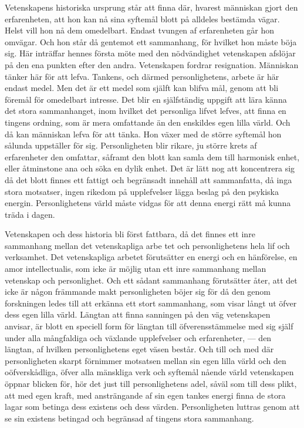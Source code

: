 \documentclass[12pt]{article}
\newcommand{\opage}[1]{\marginnote{\footnotesize\textit{[#1]}}}
\begin{document}
Vetenskapens historiska ursprung står att finna där, hvarest människan gjort den erfarenheten, att hon kan nå sina syftemål blott på alldeles bestämda vägar. Helst vill hon nå dem omedelbart. Endast tvungen af erfarenheten går hon omvägar. Och hon står då gentemot ett sammanhang, för hvilket hon måste böja sig. Här inträffar hennes första möte med den nödvändighet vetenskapen afslöjar på den ena punkten efter den %
\opage{11}
andra. Vetenskapen fordrar resignation. Människan tänker här för att lefva. Tankens, och därmed personlighetens, arbete är här endast medel. Men det är ett medel som själft kan blifva mål, genom att bli föremål för omedelbart intresse. Det blir en själfständig uppgift att lära känna det stora sammanhanget, inom hvilket det personliga lifvet lefves, att finna en tingens ordning, som är mera omfattande än den enskildes egen lilla värld. Och då kan människan lefva för att tänka. Hon växer med de större syftemål hon sålunda uppställer för sig. Personligheten blir rikare, ju större krets af erfarenheter den omfattar, såframt den blott kan samla dem till harmonisk enhet, eller åtminstone ana och söka en dylik enhet. Det är lätt nog att koncentrera sig då det blott finnes ett fattigt och begränsadt innehåll att sammanfatta, då inga stora motsatser, ingen rikedom på upplefvelser lägga beslag på den psykiska energin. Personlighetens värld måste vidgas för att denna energi rätt må kunna träda i dagen.

Vetenskapen och dess historia bli först fattbara, då det finnes ett inre sammanhang mellan det vetenskapliga arbe%
\opage{12}
tet och personlighetens hela lif och verksamhet. Det vetenskapliga arbetet förutsätter en energi och en hänförelse, en amor intellectualis, som icke är möjlig utan ett inre sammanhang mellan vetenskap och personlighet. Och ett sådant sammanhang förutsätter åter, att det icke är någon främmande makt personligheten böjer sig för då den genom forskningen ledes till att erkänna ett stort sammanhang, som visar långt ut öfver dess egen lilla värld. Längtan att finna sanningen på den väg vetenskapen anvisar, är blott en speciell form för längtan till öfverensstämmelse med sig själf under alla mångfaldiga och växlande upplefvelser och erfarenheter, --- den längtan, af hvilken personlighetens eget väsen består. Och till och med där personligheten skarpt förnimmer motsatsen mellan sin egen lilla värld och den oöfverskådliga, öfver alla mänskliga verk och syftemål nående värld vetenskapen öppnar blicken för, hör det just till personlighetens adel, såväl som till dess plikt, att med egen kraft, med ansträngande af sin egen tankes energi finna de stora lagar som betinga dess existens och dess värden. Personligheten luttras genom att se sin %
\opage{13}
existens betingad och begränsad af tingens stora sammanhang.
\end{document}
